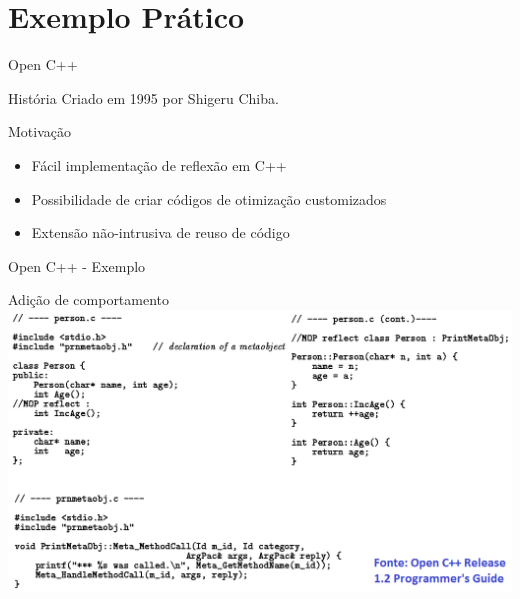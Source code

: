 \documentclass[12pt,t]{beamer}
\begin{document}
 	\section{Exemplo Prático}
	 \begin{frame}{Open C++}
	 	\begin{block}{História}
			Criado em 1995 por Shigeru Chiba.
 	 	\end{block}
 	 	\pause
	 	\begin{block}{Motivação}
			\begin{itemize}
 	 			\item Fácil implementação de reflexão em C++
 	 			\pause
 	 			\item Possibilidade de criar códigos de otimização customizados
 	 			\pause
				\item Extensão não-intrusiva de reuso de código
 	 		\end{itemize}
 	 	\end{block}
	 \end{frame}
	 \begin{frame}{Open C++ - Exemplo}
 	 	\begin{exampleblock}{Adição de comportamento}
 	 		\includegraphics[width=1\textwidth]{examples/example_open_cxx}
 	 	\end{exampleblock}
	 \end{frame}
\end{document}
